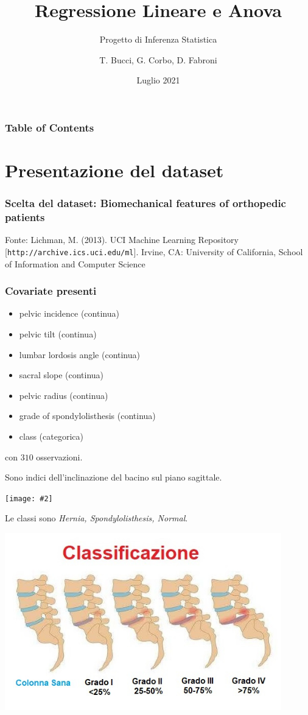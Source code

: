 \documentclass{beamer}
\title{Regressione Lineare e Anova}
\subtitle{Progetto di Inferenza Statistica}
\author{T. Bucci, G. Corbo, D. Fabroni}
\institute{Politecnico di Milano}
\date{Luglio 2021}
\newcommand{\fg}[2]{%
  \begin{center}
      \texttt{[image: \#2]}%
  \end{center}
}
\begin{document}
\frame{\titlepage}

\begin{frame}
    \frametitle{Table of Contents}
    \tableofcontents
\end{frame}

\section{Presentazione del dataset}
\begin{frame}
    \frametitle{Scelta del dataset: Biomechanical features of orthopedic patients}
    Fonte: Lichman, M. (2013). UCI Machine Learning Repository [\texttt{http://archive.ics.uci.edu/ml}]. Irvine, CA: University of California, School of Information and Computer Science
\end{frame}


\begin{frame}
    \frametitle{Covariate presenti}
    \begin{itemize}
        \item pelvic incidence (continua)
        \item pelvic tilt (continua)
        \item lumbar lordosis angle (continua)
        \item sacral slope (continua)
        \item pelvic radius (continua)
        \item grade of spondylolisthesis (continua)
        \item class (categorica)
    \end{itemize}
    con $310$ osservazioni.
\end{frame}


\begin{frame}
	Sono indici dell'inclinazione del bacino sul piano sagittale.
	\fg{0.5}{piani.png}
	Le classi sono \emph{Hernia, Spondylolisthesis, Normal}. %
\end{frame}


\begin{frame}
    \begin{center}
        \includegraphics[width=0.9\textwidth]{classificazione-spondilolistesi.jpg}
    \end{center}
\end{frame}
\end{document}
